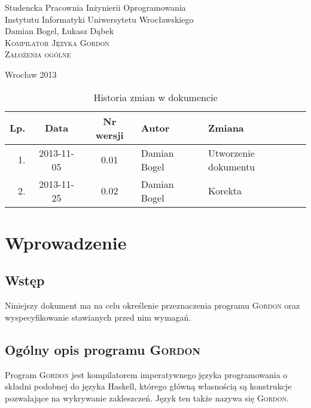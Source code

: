 \documentclass{documentation}
\begin{document}
\begin{titlepage}
\begin{center}
Studencka Pracownia Inżynierii Oprogramowania\\
Instytutu Informatyki Uniwersytetu Wrocławskiego\\[6cm]

Damian Bogel, Łukasz Dąbek\\[1cm]
\textsc{\LARGE Kompilator Języka Gordon}\\[0.5cm]
\textsc{\large Założenia ogólne}

\vfill
Wrocław 2013 \\[2.5cm]

\end{center}
\end{titlepage}

\newpage
\begin{table}
	\centering
    \captionsetup{name=Tabela}
	\caption{Historia zmian w dokumencie}
		\begin{tabular}{|r|c|c|l|l|}
		\hline
		Lp.  & Data       & Nr wersji & Autor                 & Zmiana \\ \hline
		1.   & 2013-11-05 & 0.01 & Damian Bogel & Utworzenie dokumentu \\ \hline
		2.   & 2013-11-25 & 0.02 & Damian Bogel & Korekta \\ \hline
	\end{tabular}
\end{table}
\newpage

\tableofcontents
\setcounter{page}{2}

\newpage

\section{Wprowadzenie}
\subsection{Wstęp}
\noindent Niniejszy dokument ma na celu określenie przeznaczenia programu \textsc{Gordon} oraz wyspecyfikowanie stawianych przed nim wymagań.

\subsection{Ogólny opis programu \textsc{Gordon}}
\noindent Program \textsc{Gordon} jest kompilatorem imperatywnego języka programowania o składni podobnej do języka Haskell, którego główną własnością są konstrukcje pozwalające na wykrywanie zakleszczeń. Język ten także nazywa się \textsc{Gordon}.
\end{document}

